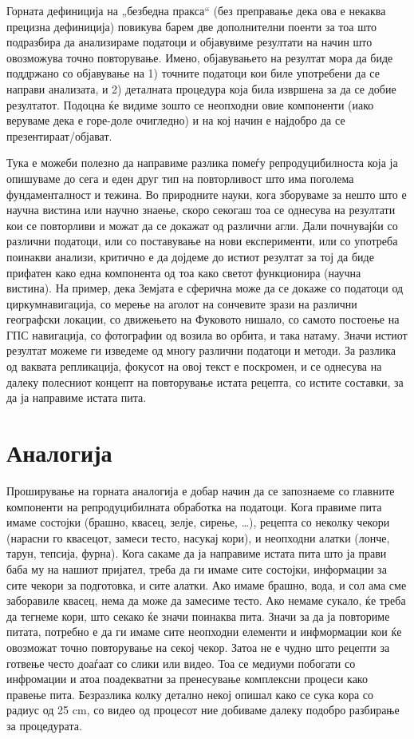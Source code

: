 \documentclass[
]{book}
\begin{document}
Горната дефиниција на „безбедна пракса`` (без преправање дека ова е некаква прецизна дефиниција) повикува барем две дополнителни поенти за тоа што подразбира да анализираме податоци и објавувиме резултати на начин што овозможува точно повторување. Имено, објавувањето на резултат мора да биде поддржано со објавување на 1) точните податоци кои биле употребени да се направи анализата, и 2) деталната процедура која била извршена за да се добие резултатот. Подоцна ќе видиме зошто се неопходни овие компоненти (иако веруваме дека е горе-доле очигледно) и на кој начин е најдобро да се презентираат/објават.

Тука е можеби полезно да направиме разлика помеѓу репродуцибилноста која ја опишуваме до сега и еден друг тип на повторливост што има поголема фундаменталност и тежина. Во природните науки, кога зборуваме за нешто што е научна вистина или научно знаење, скоро секогаш тоа се однесува на резултати кои се повторливи и можат да се докажат од различни агли. Дали почнувајќи со различни податоци, или со поставување на нови експерименти, или со употреба поинакви анализи, критично е да дојдеме до истиот резултат за тој да биде прифатен како една компонента од тоа како светот функционира (научна вистина). На пример, дека Земјата е сферична може да се докаже со податоци од циркумнавигација, со мерење на аголот на сончевите зрази на различни географски локации, со движењето на Фуковото нишало, со самото постоење на ГПС навигација, со фотографии од возила во орбита, и така натаму. Значи истиот резултат можеме ги изведеме од многу различни податоци и методи. За разлика од ваквата репликација, фокусот на овој текст е поскромен, и се однесува на далеку полесниот концепт на повторување истата рецепта, со истите составки, за да ја направиме истата пита.

\hypertarget{analogy}{%
\section{Аналогија}\label{analogy}}

Проширување на горната аналогија е добар начин да се запознаеме со главните компоненти на репродуцибилната обработка на податоци. Кога правиме пита имаме состојки (брашно, квасец, зелје, сирење, \ldots), рецепта со неколку чекори (нарасни го квасецот, замеси тесто, насукај кори), и неопходни алатки (лонче, тарун, тепсија, фурна). Кога сакаме да ја направиме истата пита што ја прави баба му на нашиот пријател, треба да ги имаме сите состојки, информации за сите чекори за подготовка, и сите алатки. Ако имаме брашно, вода, и сол ама сме заборавиле квасец, нема да може да замесиме тесто. Ако немаме сукало, ќе треба да тегнеме кори, што секако ќе значи поинаква пита. Значи за да ја повториме питата, потребно е да ги имаме сите неопходни елементи и инфмормации кои ќе овозможат точно повторување на секој чекор. Затоа не е чудно што рецепти за готвење често доаѓаат со слики или видео. Тоа се медиуми побогати со инфромации и атоа поадекватни за пренесување комплексни процеси како правење пита. Безразлика колку детално некој опишал како се сука кора со радиус од 25 cm, со видео од процесот ние добиваме далеку подобро разбирање за процедурата.
\end{document}

